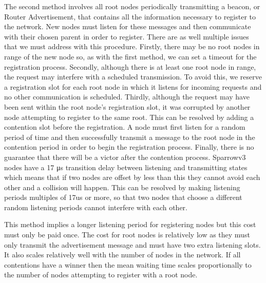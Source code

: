 The second method involves all root nodes periodically transmitting a beacon,
or Router Advertisement, that contains all the information necessary to
register to the network. New nodes must listen for these messages and then
communicate with their chosen parent in order to register.  There are as well
multiple issues that we must address with this procedure. Firstly, there may be
no root nodes in range of the new node so, as with the first method, we can set
a timeout for the registration process. Secondly, although there is at least
one root node in range, the request may interfere with a scheduled
transmission. To avoid this, we reserve a registration slot for each root node
in which it listens for incoming requests and no other communication is
scheduled. Thirdly, although the request may have been sent within the root
node's registration slot, it was corrupted by another node attempting to
register to the same root. This can be resolved by adding a contention slot
before the registration. A node must first listen for a random period of time
and then successfully transmit a message to the root node in the contention
period in order to begin the registration process. Finally, there is no
guarantee that there will be a victor after the contention process. Sparrowv3
nodes have a 17 μs transition delay between listening and transmitting states
which means that if two nodes are offset by less than this they cannot avoid
each other and a collision will happen. This can be resolved by making
listening periods multiples of 17us or more, so that two nodes that choose a
different random listening periods cannot interfere with each other.

This method implies a longer listening period for registering nodes but this
cost must only be paid once. The cost for root nodes is relatively low as they
must only transmit the advertisement message and must have two extra listening
slots. It also scales relatively well with the number of nodes in the network.
If all contentions have a winner then the mean waiting time scales
proportionally to the number of nodes attempting to register with a root node. 

\vspace{\baselineskip}

